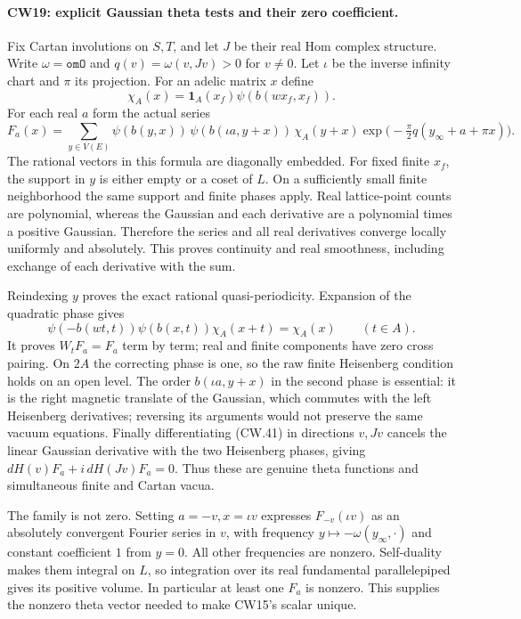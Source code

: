 \paragraph{CW19: explicit Gaussian theta tests and their zero coefficient.}
Fix Cartan involutions on $S,T$, and let $J$ be their real Hom
complex structure.  Write $\omega=\texttt{omO}$ and
$q(v)=\omega(v,Jv)>0$ for $v\ne0$.
Let $\iota$ be the inverse infinity chart and $\pi$ its projection.
For an adelic matrix $x$ define
\[
 \chi_A(x)=\mathbf1_A(x_f)\psi(b(wx_f,x_f)).
\]
For each real $a$ form the actual series
\[
 F_a(x)=\sum_{y\in V(E)}\psi(b(y,x))\,
    \psi(b(\iota a,y+x))\,\chi_A(y+x)
    \exp\bigl(-\tfrac\pi2 q(y_\infty+a+\pi x)\bigr).
                                                               \tag{CW.41}
\]
The rational vectors in this formula are diagonally embedded.
For fixed finite $x_f$, the support in $y$ is either empty or a
coset of $L$.  On a sufficiently small finite neighborhood the
same support and finite phases apply.  Real lattice-point counts
are polynomial, whereas the Gaussian and each derivative are a
polynomial times a positive Gaussian.  Therefore the series and
all real derivatives converge locally uniformly and absolutely.
This proves continuity and real smoothness, including exchange of
each derivative with the sum.

Reindexing $y$ proves the exact rational quasi-periodicity.
Expansion of the quadratic phase gives
\[
 \psi(-b(wt,t))\psi(b(x,t))\chi_A(x+t)=\chi_A(x)
                       \qquad(t\in A).
\]
It proves $W_tF_a=F_a$ term by term; real and finite components
have zero cross pairing.  On $2A$ the correcting phase is one,
so the raw finite Heisenberg condition holds on an open level.
The order $b(\iota a,y+x)$ in the second phase is essential:
it is the right magnetic translate of the Gaussian, which commutes
with the left Heisenberg derivatives; reversing its arguments
would not preserve the same vacuum equations.
Finally differentiating (CW.41) in directions $v,Jv$ cancels the
linear Gaussian derivative with the two Heisenberg phases, giving
$dH(v)F_a+i\,dH(Jv)F_a=0$.  Thus these are genuine theta functions
and simultaneous finite and Cartan vacua.

The family is not zero.  Setting $a=-v,x=\iota v$ expresses
$F_{-v}(\iota v)$ as an absolutely convergent Fourier series in
$v$, with frequency $y\mapsto-\omega(y_\infty,\cdot)$ and constant
coefficient $1$ from $y=0$.  All other frequencies are nonzero.
Self-duality makes them integral on $L$, so integration over its
real fundamental parallelepiped gives its positive volume.
In particular at least one $F_a$ is nonzero.  This supplies the
nonzero theta vector needed to make CW15's scalar unique.

